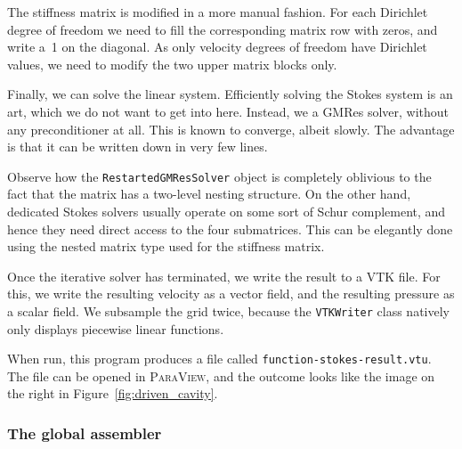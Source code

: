 \documentclass[a4paper,10pt,headings=normal,bibliography=totoc]{scrartcl}
\newcommand{\cpp}[1]{\lstinline[basicstyle=\ttfamily]!#1!}
\newcommand{\program}[1]{\textsc{#1}\xspace}
\newcommand{\file}[1]{\texttt{#1}}
\begin{document}
The stiffness matrix is modified in a more manual fashion.  For each Dirichlet degree of freedom we need to fill the corresponding matrix row
with zeros, and write a~1 on the diagonal.  As only velocity
degrees of freedom have Dirichlet values, we need to modify the two upper matrix blocks only.
%

%
Finally, we can solve the linear system.  Efficiently solving the Stokes system is an art, which we do not want to
get into here.  Instead, we a GMRes solver, without any preconditioner at all.  This is known to converge,
albeit slowly.
The advantage is that it can be written down in very few lines.
%

%
Observe how the \cpp{RestartedGMResSolver} object is completely oblivious to the fact that the matrix
has a two-level nesting structure.  On the other hand, dedicated Stokes solvers usually operate
on some sort of Schur complement, and hence they need direct access
to the four submatrices.  This can be elegantly done using the nested matrix type
used for the stiffness matrix.

Once the iterative solver has terminated, we write the result to a VTK file.  For this, we write the resulting velocity as a vector field,
and the resulting pressure as a scalar field.  We subsample the grid twice, because the \cpp{VTKWriter}
class natively only displays piecewise linear functions.
%

%
When run, this program produces a file called \file{function-stokes-result.vtu}.  The file can be opened in
\program{ParaView}, and the outcome looks like the image on the right in Figure~\ref{fig:driven_cavity}.

\subsubsection{The global assembler}
\end{document}
